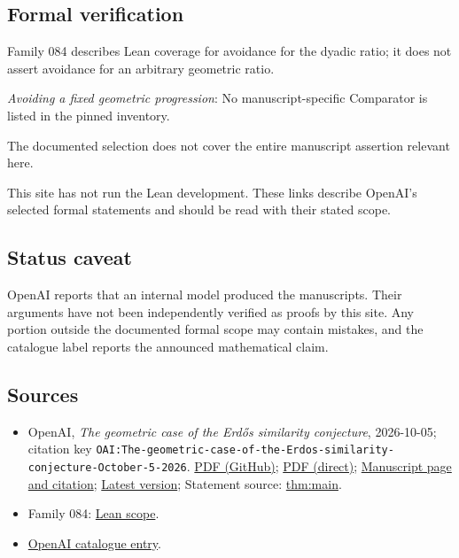 \documentclass[11pt]{article}
\begin{document}
\subsection{Formal verification}
Family 084 describes Lean coverage for avoidance for the dyadic ratio; it does not assert avoidance for an arbitrary geometric ratio.

\textit{Avoiding a fixed geometric progression}: No manuscript-specific Comparator is listed in the pinned inventory.

The documented selection does not cover the entire manuscript assertion relevant here.

This site has not run the Lean development. These links describe OpenAI’s selected formal statements and should be read with their stated scope.

\subsection{Status caveat}
OpenAI reports that an internal model produced the manuscripts. Their arguments have not been independently verified as proofs by this site. Any portion outside the documented formal scope may contain mistakes, and the catalogue label reports the announced mathematical claim.

\subsection{Sources}
\begin{itemize}
\item OpenAI, \emph{The geometric case of the Erdős similarity conjecture}, 2026-10-05; citation key \texttt{OAI:The-geometric-case-of-the-Erdos-similarity-conjecture-October-5-2026}. \href{https://github.com/openai/math/blob/adc7f1241b42e322a6451854ab7e4b4c146bf78a/preprints/The-geometric-case-of-the-Erdos-similarity-conjecture-October-5-2026/geometric-erdos-similarity.pdf}{PDF (GitHub)}; \href{https://github.com/openai/math/raw/adc7f1241b42e322a6451854ab7e4b4c146bf78a/preprints/The-geometric-case-of-the-Erdos-similarity-conjecture-October-5-2026/geometric-erdos-similarity.pdf}{PDF (direct)}; \href{https://github.com/openai/math/blob/adc7f1241b42e322a6451854ab7e4b4c146bf78a/preprints/The-geometric-case-of-the-Erdos-similarity-conjecture-October-5-2026/README.md}{Manuscript page and citation}; \href{https://github.com/openai/math/blob/main/preprints/The-geometric-case-of-the-Erdos-similarity-conjecture-October-5-2026/geometric-erdos-similarity.pdf}{Latest version}; Statement source: \href{https://github.com/openai/math/blob/adc7f1241b42e322a6451854ab7e4b4c146bf78a/preprints/The-geometric-case-of-the-Erdos-similarity-conjecture-October-5-2026/build/sections/01-introduction.tex\#L17}{thm:main}.
\item Family 084: \href{https://github.com/openai/math/blob/adc7f1241b42e322a6451854ab7e4b4c146bf78a/lean/docs/084.md}{Lean scope}.
\item \href{https://github.com/openai/math/blob/adc7f1241b42e322a6451854ab7e4b4c146bf78a/CONTENTS.md}{OpenAI catalogue entry}.
\end{itemize}
\end{document}
